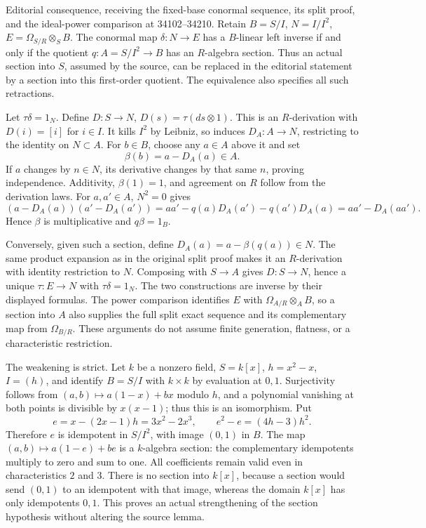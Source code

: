 Editorial consequence, receiving the fixed-base conormal sequence, its split proof, and the ideal-power comparison at 34102--34210. Retain \(B=S/I\), \(N=I/I^2\), \(E=\Omega_{S/R}\otimes_S B\). The conormal map \(\delta:N\to E\) has a \(B\)-linear left inverse if and only if the quotient \(q:A=S/I^2\to B\) has an \(R\)-algebra section. Thus an actual section into \(S\), assumed by the source, can be replaced in the editorial statement by a section into this first-order quotient. The equivalence also specifies all such retractions.

Let \(\tau\delta=1_N\). Define \(D:S\to N\), \(D(s)=\tau(ds\otimes1)\). This is an \(R\)-derivation with \(D(i)=[i]\) for \(i\in I\). It kills \(I^2\) by Leibniz, so induces \(D_A:A\to N\), restricting to the identity on \(N\subset A\). For \(b\in B\), choose any \(a\in A\) above it and set \[
\beta(b)=a-D_A(a)\in A.
\] If \(a\) changes by \(n\in N\), its derivative changes by that same \(n\), proving independence. Additivity, \(\beta(1)=1\), and agreement on \(R\) follow from the derivation laws. For \(a,a'\in A\), \(N^2=0\) gives \[
(a-D_A(a))(a'-D_A(a'))
=aa'-q(a)D_A(a')-q(a')D_A(a)
=aa'-D_A(aa').
\] Hence \(\beta\) is multiplicative and \(q\beta=1_B\).

Conversely, given such a section, define \(D_A(a)=a-\beta(q(a))\in N\). The same product expansion as in the original split proof makes it an \(R\)-derivation with identity restriction to \(N\). Composing with \(S\to A\) gives \(D:S\to N\), hence a unique \(\tau:E\to N\) with \(\tau\delta=1_N\). The two constructions are inverse by their displayed formulas. The power comparison identifies \(E\) with \(\Omega_{A/R}\otimes_A B\), so a section into \(A\) also supplies the full split exact sequence and its complementary map from \(\Omega_{B/R}\). These arguments do not assume finite generation, flatness, or a characteristic restriction.

The weakening is strict. Let \(k\) be a nonzero field, \(S=k[x]\), \(h=x^2-x\), \(I=(h)\), and identify \(B=S/I\) with \(k\times k\) by evaluation at \(0,1\). Surjectivity follows from \((a,b)\mapsto a(1-x)+bx\) modulo \(h\), and a polynomial vanishing at both points is divisible by \(x(x-1)\); thus this is an isomorphism. Put \[
e=x-(2x-1)h=3x^2-2x^3,
\qquad e^2-e=(4h-3)h^2.
\] Therefore \(e\) is idempotent in \(S/I^2\), with image \((0,1)\) in \(B\). The map \((a,b)\mapsto a(1-e)+be\) is a \(k\)-algebra section: the complementary idempotents multiply to zero and sum to one. All coefficients remain valid even in characteristics \(2\) and \(3\). There is no section into \(k[x]\), because a section would send \((0,1)\) to an idempotent with that image, whereas the domain \(k[x]\) has only idempotents \(0,1\). This proves an actual strengthening of the section hypothesis without altering the source lemma.


